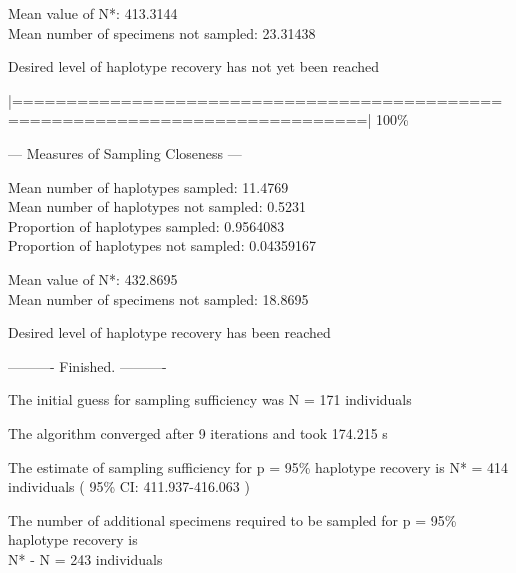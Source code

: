 {\vspace{2mm} 
 
\noindent Mean value of N*: 413.3144 \\
Mean number of specimens not sampled: 23.31438

\vspace{3mm}
 
\noindent Desired level of haplotype recovery has not yet been reached

\vspace{2mm}

\noindent |==============================================================================| 100\%

\vspace{3mm}

\noindent --- Measures of Sampling Closeness ---

\vspace{2mm} 
 
\noindent Mean number of haplotypes sampled: 11.4769  \\
Mean number of haplotypes not sampled: 0.5231  \\
Proportion of haplotypes sampled: 0.9564083 \\
Proportion of haplotypes not sampled: 0.04359167    

\vspace{2mm} 
 
\noindent Mean value of N*: 432.8695 \\
Mean number of specimens not sampled: 18.8695 

\vspace{3mm}
 
\noindent Desired level of haplotype recovery has been reached

\vspace{2mm}

\noindent ---------- Finished. ----------
        
\noindent The initial guess for sampling sufficiency was N = 171 individuals
 
\noindent The algorithm converged after 9 iterations and took 174.215 s 
 
\noindent The estimate of sampling sufficiency for p = 95\% haplotype recovery is N* = 414 \\ individuals ( 95\% CI: 411.937-416.063 )

\noindent The number of additional specimens required to be sampled for p = 95\% haplotype recovery is \\ N* - N = 243 individuals}

